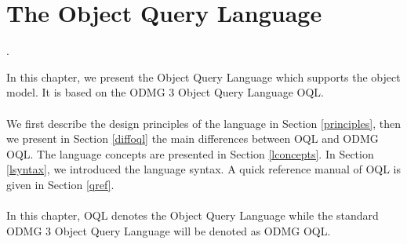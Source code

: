 

\newcommand{\mantitle}{\textsc{Object Query Language}}


\tableofcontents

\chapter*{The Object Query Language}
\newcommand{\ex}{\emph{expr} }
\newcommand{\oqlsect}[1]{Section \ref{#1}}
\newcommand{\bin}[1]{\ex\texttt{#1} \ex}
\newcommand{\ass}[1]{\emph{lvalue} \texttt{#1} \ex}
\newcommand{\una}[1]{\texttt{#1} \ex}
\newcommand{\unar}[1]{\ex \texttt{#1}}
\newcommand{\ide}{\emph{identifier} }
\newcommand{\unide}[1]{\texttt{#1} \emph{identifier}}

\newcommand{\xtab}{longtable}
\newcommand{\btab}{\\\begin{longtable}}
\newcommand{\etab}{\end{longtable}}
\newcommand{\dimtab}{|p{3cm}|p{4cm}|}
\newcommand{\dimtabx}{|p{3cm}|p{5cm}|}

\newcommand{\rerr}{\emph{raises an error}}
\newcommand{\Cidem}{expression syntax, semantics, associativity
and precedence are quite identical to the corresponding C and C++ expressions}.
\newcommand{\geninfo}{\hline \multicolumn{2}{|c|}{\emph{General Information}}}
\newcommand{\expex}[1]{\hline \multicolumn{#1}{|c|}{\emph{Expression Examples}}}
\newcommand{\poscomb}[1]{\hline \multicolumn{#1}{|c|}{\emph{Possible Operand Combinations}}}
\newcommand{\bettabx}{\mbox{ }\\\\\mbox{ }\\}
\newcommand{\bettab}{\mbox{}}

In this chapter, we present the \eyedb Object Query Language which supports
the \eyedb object model. It is based on the ODMG 3 Object Query Language
OQL.
\\
\\
We first describe the design principles of the language in
\oqlsect{principles}, then
we present in \oqlsect{diffoql} the main differences between \eyedb
OQL and ODMG OQL.
The language concepts are presented in \oqlsect{lconcepts}.
In \oqlsect{lsyntax}, we introduced the language syntax.
A quick reference manual of OQL is given in \oqlsect{qref}.
\\
\\
In this chapter, OQL denotes the \eyedb Object Query Language while
the standard ODMG 3 Object Query Language will be denoted as ODMG OQL.

